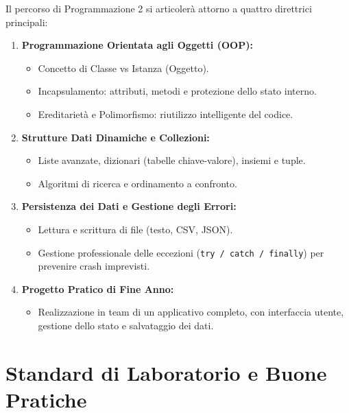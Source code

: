 Il percorso di Programmazione 2 si articolerà attorno a quattro direttrici principali:

\begin{enumerate}
  \item \textbf{Programmazione Orientata agli Oggetti (OOP):}
  \begin{itemize}
    \item Concetto di Classe vs Istanza (Oggetto).
    \item Incapsulamento: attributi, metodi e protezione dello stato interno.
    \item Ereditarietà e Polimorfismo: riutilizzo intelligente del codice.
  \end{itemize}

  \item \textbf{Strutture Dati Dinamiche e Collezioni:}
  \begin{itemize}
    \item Liste avanzate, dizionari (tabelle chiave-valore), insiemi e tuple.
    \item Algoritmi di ricerca e ordinamento a confronto.
  \end{itemize}

  \item \textbf{Persistenza dei Dati e Gestione degli Errori:}
  \begin{itemize}
    \item Lettura e scrittura di file (testo, CSV, JSON).
    \item Gestione professionale delle eccezioni (\texttt{try / catch / finally}) per prevenire crash imprevisti.
  \end{itemize}

  \item \textbf{Progetto Pratico di Fine Anno:}
  \begin{itemize}
    \item Realizzazione in team di un applicativo completo, con interfaccia utente, gestione dello stato e salvataggio dei dati.
  \end{itemize}
\end{enumerate}

\section{Standard di Laboratorio e Buone Pratiche}

